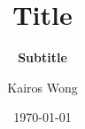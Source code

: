 \documentclass[10pt, aspectratio=169]{beamer}
\title{\textbf{Title}}
\subtitle{\textbf{Subtitle}}
\author{Kairos Wong}
\institute{Westlake University}
\date{\today}
\begin{document}
\frame{\titlepage}

\end{document}
